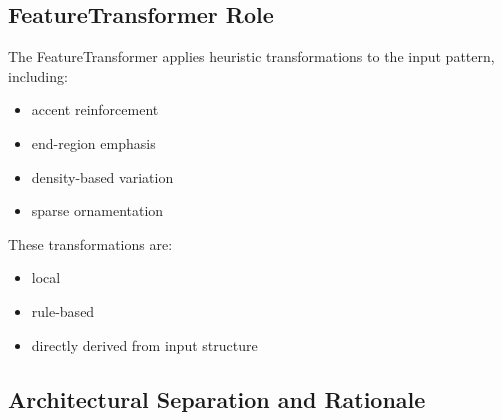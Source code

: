 \subsection{FeatureTransformer Role}\label{featuretransformer-role}

The FeatureTransformer applies heuristic transformations to the input
pattern, including:

\begin{itemize}
\item
  accent reinforcement
\item
  end-region emphasis
\item
  density-based variation
\item
  sparse ornamentation
\end{itemize}

These transformations are:

\begin{itemize}
\item
  local
\item
  rule-based
\item
  directly derived from input structure
\end{itemize}

\subsection{Architectural Separation and Rationale}\label{architectural-separation-and-rationale}

